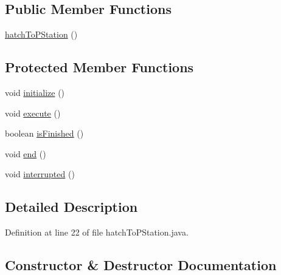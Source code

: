 \subsection*{Public Member Functions}
\begin{DoxyCompactItemize}
\item 
\mbox{\hyperlink{classorg_1_1usfirst_1_1frc3707_1_1_creedence_1_1commands_1_1hatch_to_p_station_ae01d853259842ad5632db4f03acabc8e}{hatch\+To\+P\+Station}} ()
\end{DoxyCompactItemize}
\subsection*{Protected Member Functions}
\begin{DoxyCompactItemize}
\item 
void \mbox{\hyperlink{classorg_1_1usfirst_1_1frc3707_1_1_creedence_1_1commands_1_1hatch_to_p_station_a7303274c3338bb033ec2fb8b1494fc7e}{initialize}} ()
\item 
void \mbox{\hyperlink{classorg_1_1usfirst_1_1frc3707_1_1_creedence_1_1commands_1_1hatch_to_p_station_ad801477e26a0c8718d34a762e91b8526}{execute}} ()
\item 
boolean \mbox{\hyperlink{classorg_1_1usfirst_1_1frc3707_1_1_creedence_1_1commands_1_1hatch_to_p_station_a8b92b45e3a9729e2893bd4cc26319a97}{is\+Finished}} ()
\item 
void \mbox{\hyperlink{classorg_1_1usfirst_1_1frc3707_1_1_creedence_1_1commands_1_1hatch_to_p_station_ae53b81ac271f048cea90bbd14afbbedd}{end}} ()
\item 
void \mbox{\hyperlink{classorg_1_1usfirst_1_1frc3707_1_1_creedence_1_1commands_1_1hatch_to_p_station_ac595eb235ca45bf968dd5cf7a0e4abc5}{interrupted}} ()
\end{DoxyCompactItemize}


\subsection{Detailed Description}


Definition at line 22 of file hatch\+To\+P\+Station.\+java.



\subsection{Constructor \& Destructor Documentation}
\mbox{\label{classorg_1_1usfirst_1_1frc3707_1_1_creedence_1_1commands_1_1hatch_to_p_station_ae01d853259842ad5632db4f03acabc8e}} 
